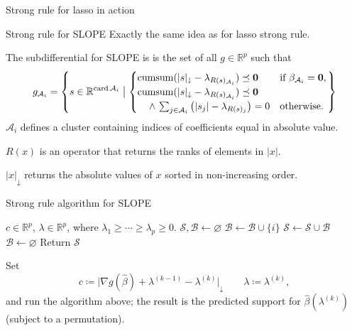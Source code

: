 \documentclass[10pt,ignorenonframetext]{beamer}
\begin{document}
\begin{frame}[fragile]{Strong rule for lasso in action}
  \begin{figure}
    \centering
    
  \end{figure}
\end{frame}

\begin{frame}{Strong rule for SLOPE}
  Exactly the same idea as for lasso strong rule.\medskip

  The subdifferential for SLOPE is is the set of all \(g \in \mathbb{R}^p\) such that
  \[
    g_{\mathcal{A}_i} =
    \left\{s \in \mathbb{R}^{\mathop{\mathrm{card}}{\mathcal{A}_i}} \bigm\vert
      \begin{cases}
        \mathop{\mathrm{cumsum}}(|s|_\downarrow - \lambda_{R(s)_{\mathcal{A}_i}}) \preceq \mathbf{0} & \text{if } \beta_{\mathcal{A}_i} = \mathbf{0}, \\
        \mathop{\mathrm{cumsum}}(|s|_\downarrow - \lambda_{R(s)_{\mathcal{A}_i}}) \preceq \mathbf{0}                                                  \\\quad\,\wedge\, \sum_{j \in \mathcal{A}_i}\left(|s_j| - \lambda_{R(s)_j}\right) = 0 & \text{otherwise.}
      \end{cases}
    \right\}
  \]
  \(\mathcal{A}_i\) defines a \alert{cluster} containing indices of coefficients
  equal in absolute value.\medskip

  \(R(x)\) is an operator that returns the \alert{ranks} of elements in \(|x|\).\medskip

  \(|x|_\downarrow\) returns the absolute values of \(x\) sorted in non-increasing
  order.\medskip
\end{frame}

\begin{frame}[fragile]{Strong rule algorithm for SLOPE}

  \begin{algorithmic}[1]
    \Require \(c \in \mathbb{R}^p\),
    \(\lambda \in \mathbb{R}^p\), where
    \(\lambda_1 \geq \cdots \geq \lambda_p \geq 0\).
    \State \(\mathcal{S}, \mathcal{B} \gets \varnothing\)
    \State \(\mathcal{B} \gets \mathcal{B} \cup \{i\}\)
    \State \(\mathcal{S} \gets \mathcal{S} \cup \mathcal{B}\)
    \State \(\mathcal{B} \gets \varnothing\)
    \EndIf
    \EndFor
    \State Return \(\mathcal{S}\)
  \end{algorithmic}
  \medskip
  Set
  \[
    c \coloneqq \lvert \nabla g(\hat\beta)+ \lambda^{(k-1)} - \lambda^{(k)}\rvert_\downarrow \qquad \lambda \coloneqq \lambda^{(k)},
  \] and run the algorithm above; the result is the predicted support for
  \(\hat\beta(\lambda^{(k)})\) (subject to a permutation).
\end{frame}
\end{document}
